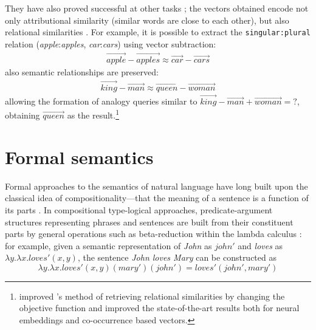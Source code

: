 They have also proved successful at other tasks \cite{mikolov2013linguistic}; the vectors obtained encode not only attributional similarity (similar words are close to each other), but also relational similarities \cite{Turney:2010:FMV:1861751.1861756}. For example, it is possible to extract the \texttt{singular:plural} relation (\textit{apple}:\textit{apples}, \textit{car}:\textit{cars}) using vector subtraction:
%
\begin{align*}
  \overrightarrow{\mathit{apple}} - \overrightarrow{\mathit{apples}}
  \approx
  \overrightarrow{\mathit{car}} - \overrightarrow{\mathit{cars}}
\end{align*}
%
also semantic relationships are preserved:
%
\begin{align*}
  \overrightarrow{\mathit{king}} - \overrightarrow{\mathit{man}}
  \approx
  \overrightarrow{\mathit{queen}} - \overrightarrow{\mathit{woman}}
\end{align*}
%
allowing the formation of analogy queries similar to
$\overrightarrow{\mathit{king}} - \overrightarrow{\mathit{man}} +
\overrightarrow{\mathit{woman}} = \mathtt{?}$, obtaining
$\overrightarrow{\mathit{queen}}$ as the
result.\footnote{ improved
  's method of retrieving relational similarities
  by changing the objective function and improved the state-of-the-art results
  both for neural embeddings and co-occurrence based vectors.}


\section{Formal semantics}
\label{sec:formal-semantics}

Formal approaches to the semantics of natural language have long built upon the
classical idea of compositionality---that the meaning of a sentence is a
function of its parts \cite{Janssen2001}. In compositional type-logical
approaches, predicate-argument structures representing phrases and sentences are
built from their constituent parts by general operations such as beta-reduction
within the lambda calculus \cite{THEO:THEO373}: for example, given a semantic
representation of \emph{John} as $\mathit{john}'$ and \emph{loves} as
$\lambda y.\lambda x.\mathit{loves}'(x, y)$, the sentence \emph{John loves Mary}
can be constructed as
$$
\lambda y.\lambda
x.\mathit{loves}'(x, y)(\mathit{mary}')(\mathit{john}') =
\mathit{loves}'(\mathit{john}', \mathit{mary}')
$$

